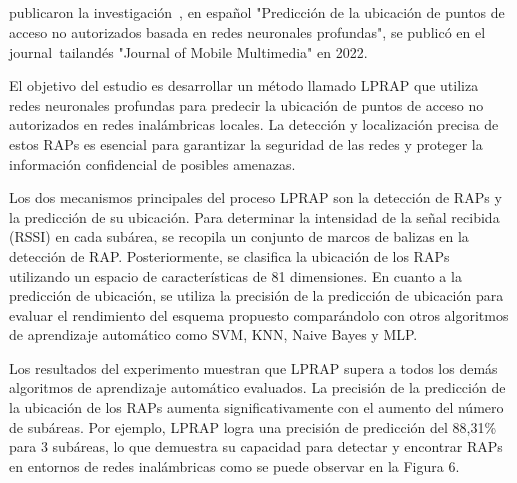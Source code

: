 \subsection{}
\cite{pr_ketkhaw2019deepl}  publicaron la investigación , en español "Predicción de la ubicación de puntos de acceso no autorizados basada en redes neuronales profundas", se publicó en el journal tailandés "Journal of Mobile Multimedia" en 2022.

El objetivo del estudio es desarrollar un método llamado LPRAP que utiliza redes neuronales profundas para predecir la ubicación de puntos de acceso no autorizados en redes inalámbricas locales. La detección y localización precisa de estos RAPs es esencial para garantizar la seguridad de las redes y proteger la información confidencial de posibles amenazas.

Los dos mecanismos principales del proceso LPRAP son la detección de RAPs y la predicción de su ubicación. Para determinar la intensidad de la señal recibida (RSSI) en cada subárea, se recopila un conjunto de marcos de balizas en la detección de RAP. Posteriormente, se clasifica la ubicación de los RAPs utilizando un espacio de características de 81 dimensiones. En cuanto a la predicción de ubicación, se utiliza la precisión de la predicción de ubicación para evaluar el rendimiento del esquema propuesto comparándolo con otros algoritmos de aprendizaje automático como SVM, KNN, Naive Bayes y MLP.

Los resultados del experimento muestran que LPRAP supera a todos los demás algoritmos de aprendizaje automático evaluados. La precisión de la predicción de la ubicación de los RAPs aumenta significativamente con el aumento del número de subáreas. Por ejemplo, LPRAP logra una precisión de predicción del 88,31\% para 3 subáreas, lo que demuestra su capacidad para detectar y encontrar RAPs en entornos de redes inalámbricas como se puede observar en la Figura 6.

